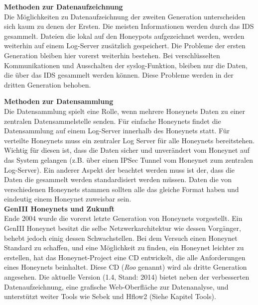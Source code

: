 \noindent\textbf{Methoden zur Datenaufzeichnung}\\
\noindent Die Möglichkeiten zu Datenaufzeichnung der zweiten Generation unterscheiden sich kaum zu denen der Ersten. Die meisten Informationen werden durch das IDS gesammelt. Dateien die lokal auf den Honeypots aufgezeichnet werden, werden weiterhin auf einem Log-Server zusätzlich gespeichert. Die Probleme der ersten Generation bleiben hier vorerst weiterhin bestehen. Bei verschlüsselten Kommunikationen und Ausschalten der syslog-Funktion, bleiben nur die Daten, die über das IDS gesammelt werden können. Diese Probleme werden in der dritten Generation behoben\cite{spitzner.2002a}.\\
\newpage

\noindent\textbf{Methoden zur Datensammlung}\\
\noindent Die Datensammlung spielt eine Rolle, wenn mehrere Honeynets Daten zu einer zentralen Datensammelstelle senden. Für einfache Honeynets findet die Datensammlung auf einem Log-Server innerhalb des Honeynets statt. Für verteilte Honeynets muss ein zentraler Log Server für alle Honeynets bereitstehen. Wichtig für diesen ist, dass die Daten sicher und unverändert vom Honeynet auf das System gelangen (z.B. über einen IPSec Tunnel vom Honeynet zum zentralen Log-Server). 
Ein anderer Aspekt der beachtet werden muss ist der, dass die Daten die gesammelt werden standardisiert werden müssen. Daten die von verschiedenen Honeynets stammen sollten alle das gleiche Format haben und eindeutig einem Honeynet zuweisbar sein\cite{spitzner.2002a}. \\

\noindent\textbf{GenIII Honeynets und Zukunft}\\
\noindent Ende 2004 wurde die vorerst letzte Generation von Honeynets vorgestellt. Ein GenIII Honeynet besitzt die selbe Netzwerkarchitektur wie dessen Vorgänger, behebt jedoch einig dessen Schwachstellen. Bei dem Versuch einen Honeynet Standard zu schaffen, und eine Möglichkeit zu finden, ein Honeynet leichter zu erstellen, hat das Honeynet-Project eine CD entwickelt, die alle Anforderungen eines Honeynets beinhaltet. Diese CD (\emph{Roo} genannt) wird als dritte Generation angesehen. Die aktuelle Version (1.4, Stand: 2014) bietet neben der verbesserten Datenaufzeichnung, eine grafische Web-Oberfläche zur Datenanalyse, und unterstützt weiter Tools wie Sebek und Hflow2 (Siehe Kapitel Tools)\cite{WebGenIII.2006b}.